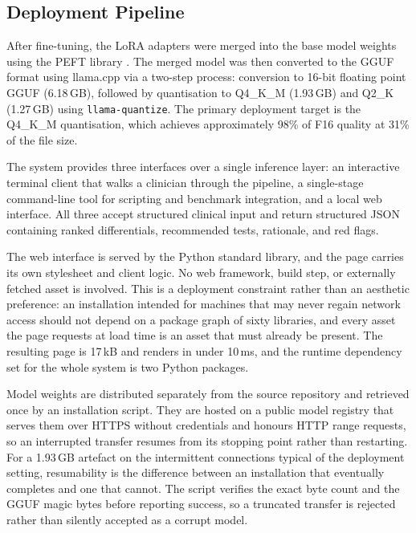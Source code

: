 \documentclass[conference]{IEEEtran}
\begin{document}
\subsection{Deployment Pipeline}

After fine-tuning, the LoRA adapters were merged into the base
model weights using the PEFT library \cite{peft2023}. The merged
model was then converted to the GGUF format using llama.cpp
\cite{gerganov2023llamacpp} via a two-step process: conversion to
16-bit floating point GGUF (6.18\,GB), followed by quantisation
to Q4\_K\_M (1.93\,GB) and Q2\_K (1.27\,GB) using
\texttt{llama-quantize}. The primary deployment target is the
Q4\_K\_M quantisation, which achieves approximately 98\% of F16
quality at 31\% of the file size.

The system provides three interfaces over a single inference layer:
an interactive terminal client that walks a clinician through the
pipeline, a single-stage command-line tool for scripting and benchmark
integration, and a local web interface. All three accept structured
clinical input and return structured JSON containing ranked
differentials, recommended tests, rationale, and red flags.

The web interface is served by the Python standard library, and the
page carries its own stylesheet and client logic. No web framework,
build step, or externally fetched asset is involved. This is a
deployment constraint rather than an aesthetic preference: an
installation intended for machines that may never regain network access
should not depend on a package graph of sixty libraries, and every
asset the page requests at load time is an asset that must already be
present. The resulting page is 17\,kB and renders in under 10\,ms,
and the runtime dependency set for the whole system is two Python
packages.

Model weights are distributed separately from the source repository and
retrieved once by an installation script. They are hosted on a public
model registry that serves them over HTTPS without credentials and
honours HTTP range requests, so an interrupted transfer resumes from
its stopping point rather than restarting. For a 1.93\,GB artefact on
the intermittent connections typical of the deployment setting,
resumability is the difference between an installation that eventually
completes and one that cannot. The script verifies the exact byte count
and the GGUF magic bytes before reporting success, so a truncated
transfer is rejected rather than silently accepted as a corrupt
model.
\end{document}

